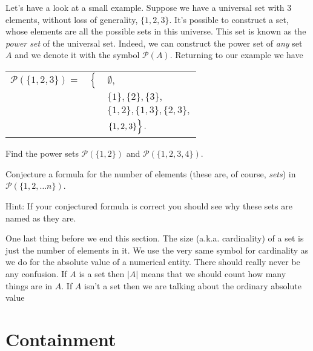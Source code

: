 Let's have a look at a small example.  Suppose we have a universal set
with 3 elements, without loss of generality, $\{1, 2, 3\}$.  It's 
possible to construct a set, whose elements are all the possible sets
in this universe.  This set is known as the 
\emph{power set} of the universal
set.  Indeed, we can construct the power set of \emph{any} set $A$ and
we denote it with the symbol ${\mathcal P}(A)$.  Returning to our
example we have 

\begin{center}
\begin{tabular}{rcl}
 ${\mathcal P}(\{1, 2, 3 \}) = $ & $\left\{ \rule{0pt}{10pt}  \right.$ & $\emptyset,$ \\
  & & $\{ 1 \},  \{ 2 \},  \{ 3 \},$ \\
  & & $\{ 1, 2 \},  \{ 1, 3 \},  \{ 2, 3 \},$ \\
  & & $\left.   \{ 1, 2, 3 \} \rule{0pt}{10pt} \right\}.$
\end{tabular}
\end{center}

\begin{exer} \rule{0pt}{0pt}

Find the power sets $ {\mathcal P}(\{1, 2 \})$ and 
${\mathcal P}(\{1, 2, 3, 4 \})$.  

Conjecture a formula for the number 
of elements (these are, of course, \emph{sets}) in 
${\mathcal P}(\{1, 2, \ldots n \})$.

Hint: If your conjectured formula is correct you should see 
why these sets are named as they are. 

\end{exer}

One last thing before we end this section.  The size (a.k.a. cardinality) of a set is just the number of elements in it.  We use the
very same symbol for cardinality as we do for the absolute value of a
numerical entity.  There should really never be any confusion.  If $A$ is
a set then $|A|$ means that we should count how many things are in $A$.
If $A$ isn't a set then we are talking about the ordinary absolute value

\clearpage 




\newpage

\section{Containment}
\label{sec:cont}

